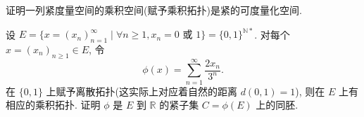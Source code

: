 \begin{exercise}
    证明一列紧度量空间的乘积空间(赋予乘积拓扑)是紧的可度量化空间.
\end{exercise}


\begin{exercise}
  设 $E=\{x=(x_n)_{n=1}^{\infty}\mid \forall n\geq 1,
  x_n=0\text{\ 或\ }1\}=\{0,1\}^{\mathbb{N}*}$.
  对每个 $x=(x_n)_{n\geq 1}\in E$, 令
  \[\phi(x)=\sum_{n=1}^{\infty}\frac{2x_n}{3^n}.\]
  在 $\{0,1\}$ 上赋予离散拓扑(这实际上对应着自然的距离 $d(0,1)=1$), 则在 $E$
  上有相应的乘积拓扑. 证明 $\phi$ 是 $E$ 到 $\mathbb{R}$ 的紧子集 $C=\phi(E)$ 上的同胚.
\end{exercise}